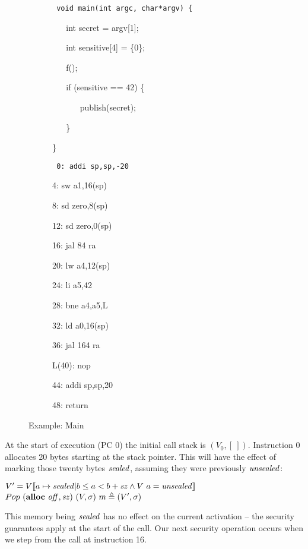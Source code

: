 \documentclass[10pt,conference]{ieeetran}%
\theoremstyle{definition}
\begin{document}
\begin{figure*}
  \begin{subfigure}[t]{.5\textwidth}
    {\tt
      void main(int argc, char*argv) \{
      
      ~ ~ int secret = argv[1];

      ~ ~ int sensitive[4] = \{0\};

      ~ ~ f();

      ~ ~ if (sensitive == 42) \{

      ~ ~ ~ ~ publish(secret);
      
      ~ ~ \}

      \}
    }
  \end{subfigure}
  \begin{subfigure}[t]{.5\textwidth}
    {\tt
      0: addi sp,sp,-20

      4: sw a1,16(sp)

      8: sd zero,8(sp)

      12: sd zero,0(sp)

      16: jal 84 ra

      20: lw a4,12(sp)

      24: li a5,42

      28: bne a4,a5,L

      32: ld a0,16(sp)

      36: jal 164 ra

      L(40): nop

      44: addi sp,sp,20

      48: return

    }
  \end{subfigure}

  \caption{Example: Main}
  \label{fig:example}
\end{figure*}

At the start of execution (PC 0) the initial call stack is \((V_0, [~])\).
Instruction 0 allocates 20 bytes starting at the stack pointer. This will have the
effect of marking those twenty bytes \(\mathit{sealed}\), assuming they were previously
\(\mathit{unsealed}\):

           {\(V' = V \llbracket a \mapsto \mathit{sealed} |
             b \leq a < b+\mathit{sz} \land V ~ a = \mathit{unsealed} \rrbracket\)}
           {\(Pop ~ (\mathbf{alloc} ~ \mathit{off, sz}) ~ (V,\sigma) ~ m \triangleq
             (V',\sigma)\)}

This memory being \(\mathit{sealed}\) has no effect on the current activation --
the security guarantees apply at the start of the call. Our next security operation
occurs when we step from the call at instruction 16.
\end{document}
